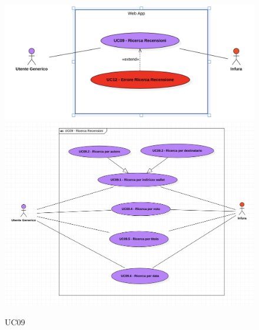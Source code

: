            \begin{figure}[H]
                \centering
                \includegraphics[scale=0.6]{src/img/UC09.png}
                \includegraphics[scale=0.4]{src/img/UC09.x.png}
                \caption{UC09}
            \end{figure}

